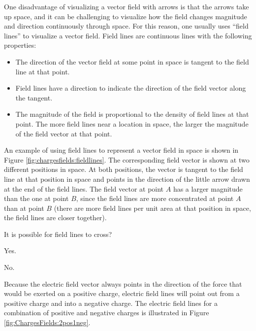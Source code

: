 One disadvantage of visualizing a vector field with arrows is that the arrows take up space, and it can be challenging to visualize how the field changes magnitude and direction continuously through space. For this reason, one usually uses ``field lines'' to visualize a vector field. Field lines are continuous lines with the following properties:
\begin{itemize}
\item The direction of the vector field at some point in space is tangent to the field line at that point.
\item Field lines have a direction to indicate the direction of the field vector along the tangent.
\item The magnitude of the field is proportional to the density of field lines at that point. The more field lines near a location in space, the larger the magnitude of the field vector at that point.
\end{itemize}
An example of using field lines to represent a vector field in space is shown in Figure \ref{fig:chargesfields:fieldlines}. The corresponding field vector is shown at two different positions in space. At both positions, the vector is tangent to the field line at that position in space and points in the direction of the little arrow drawn at the end of the field lines. The field vector at point $A$ has a larger magnitude than the one at point $B$, since the field lines are more concentrated at point $A$ than at point $B$ (there are more field lines per unit area at that position in space, the field lines are closer together).
\begin{checkpoint}\label{cp:chargesfields:efield}
\begin{MCquestion}{It is possible for field lines to cross?}
\item Yes.
\item No. \correct
\end{MCquestion}
\end{checkpoint}
Because the electric field vector always points in the direction of the force that would be exerted on a positive charge, electric field lines will point out from a positive charge and into a negative charge. The electric field lines for a combination of positive and negative charges is illustrated in Figure \ref{fig:ChargesFields:2pos1neg}.

